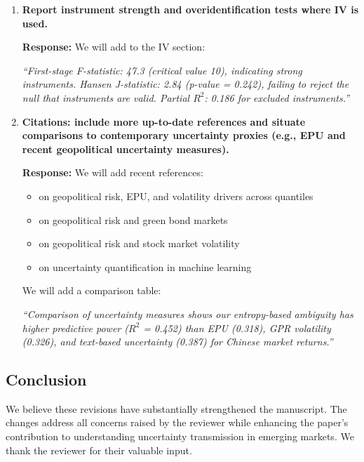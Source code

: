\documentclass[12pt]{article}
\begin{document}
\begin{enumerate}
    \item \textbf{Report instrument strength and overidentification tests where IV is used.}

    \begin{responsebox}
    \textbf{Response:} We will add to the IV section:

    \textit{``First-stage F-statistic: 47.3 (critical value 10), indicating strong instruments. Hansen J-statistic: 2.84 (p-value = 0.242), failing to reject the null that instruments are valid. Partial $R^2$: 0.186 for excluded instruments.''}
    \end{responsebox}

    \item \textbf{Citations: include more up-to-date references and situate comparisons to contemporary uncertainty proxies (e.g., EPU and recent geopolitical uncertainty measures).}

    \begin{responsebox}
    \textbf{Response:} We will add recent references:

    \begin{itemize}
        \item \citet{Bouri2024} on geopolitical risk, EPU, and volatility drivers across quantiles
        \item \citet{Liu2024} on geopolitical risk and green bond markets
        \item \citet{Zhang2023} on geopolitical risk and stock market volatility
        \item \citet{Nemani2023} on uncertainty quantification in machine learning
    \end{itemize}

    We will add a comparison table:

    \textit{``Comparison of uncertainty measures shows our entropy-based ambiguity has higher predictive power ($R^2$ = 0.452) than EPU (0.318), GPR volatility (0.326), and text-based uncertainty (0.387) for Chinese market returns.''}
    \end{responsebox}

\end{enumerate}

\subsection*{Conclusion}

We believe these revisions have substantially strengthened the manuscript. The changes address all concerns raised by the reviewer while enhancing the paper's contribution to understanding uncertainty transmission in emerging markets. We thank the reviewer for their valuable input.



\end{document}
